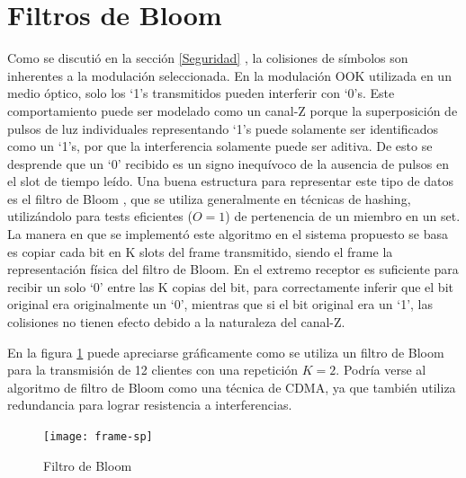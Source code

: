 \section{Filtros de Bloom}
\label{Bloomf}
Como se discutió en la sección \ref{Seguridad} , la colisiones de símbolos son inherentes a la modulación seleccionada.
En la modulación OOK utilizada en un medio óptico, solo los ‘1’s transmitidos pueden interferir con ‘0’s. Este comportamiento puede ser modelado como un canal-Z porque la superposición de pulsos de luz individuales representando ‘1’s puede solamente ser identificados como un ‘1’s, por que la interferencia solamente puede ser aditiva. De esto se desprende que un ‘0’ recibido es un signo inequívoco de la ausencia de pulsos en el slot de tiempo leído.
Una buena estructura para representar este tipo de datos es el filtro de Bloom \cite{Bloom70space/timetrade-offs}, que se utiliza generalmente en técnicas de hashing, utilizándolo para tests eficientes ($O=1$) de pertenencia de un miembro en un set.
La manera en que se implementó este algoritmo en el sistema propuesto se basa es copiar cada bit en K slots del frame transmitido, siendo el frame la representación física del filtro de Bloom.
En el extremo receptor es suficiente para recibir un solo ‘0’ entre las K copias del bit, para correctamente inferir que el bit original era originalmente un ‘0’, mientras que si el bit original era un ‘1’, las colisiones no tienen efecto debido a la naturaleza del canal-Z.

En la figura \ref{fig:Bloomf} puede apreciarse gráficamente como se utiliza un filtro de Bloom para la transmisión de 12 clientes con una repetición $K=2$. Podría verse al algoritmo de filtro de Bloom como una técnica de CDMA, ya que también utiliza redundancia para lograr resistencia a interferencias.

\begin{figure}[th]
  \begin{center}
    \texttt{[image: frame-sp]}
  \end{center}
  \caption{Filtro de Bloom}
  \label{fig:Bloomf}
\end{figure}


